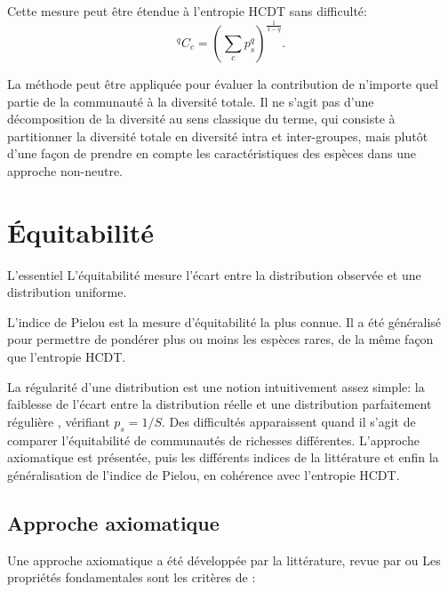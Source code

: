 \documentclass[
  11pt,
  french,
  a4paper,
  extrafontsizes,onecolumn,openright
  ]{memoir}
\newenvironment{Summary}
  {\begin{bclogo}[logo=\bctrombone, noborder=true, couleur=lightgray!50]{L'essentiel}\parindent0pt}
  {\end{bclogo}}
\newlength{\rf}
\begin{document}
Cette mesure peut être étendue à l'entropie HCDT sans difficulté:
\begin{equation}
  \label{eq:Ccq}
  \mathit{^{q}\!C_{c}} = {\left(\sum_c{p^q_s}\right)}^{\frac{1}{1-q}}.
\end{equation}

La méthode peut être appliquée pour évaluer la contribution de n'importe quel partie de la communauté à la diversité totale.
Il ne s'agit pas d'une décomposition de la diversité au sens classique du terme, qui consiste à partitionner la diversité totale en diversité intra et inter-groupes, mais plutôt d'une façon de prendre en compte les caractéristiques des espèces dans une approche non-neutre.

\hypertarget{sec-Equitabilite}{%
\chapter{Équitabilité}\label{sec-Equitabilite}}

\scriptsize

\begin{Summary}
L'équitabilité mesure l'écart entre la distribution observée et une
distribution uniforme.

L'indice de Pielou est la mesure d'équitabilité la plus connue. Il a été
généralisé pour permettre de pondérer plus ou moins les espèces rares,
de la même façon que l'entropie HCDT.
\end{Summary}

\normalsize

La régularité d'une distribution est une notion intuitivement assez simple: la faiblesse de l'écart entre la distribution réelle et une distribution parfaitement régulière \autocite{Lloyd1964}, vérifiant \(p_s={1}/{S}\).
Des difficultés apparaissent quand il s'agit de comparer l'équitabilité de communautés de richesses différentes.
L'approche axiomatique est présentée, puis les différents indices de la littérature et enfin la généralisation de l'indice de Pielou, en cohérence avec l'entropie HCDT.

\hypertarget{approche-axiomatique}{%
\section{Approche axiomatique}\label{approche-axiomatique}}

Une approche axiomatique a été développée par la littérature, revue par \textcite{Jost2010} ou \textcite{Tuomisto2012} Les propriétés fondamentales sont les critères de \textcite{Dalton1920}:
\end{document}

